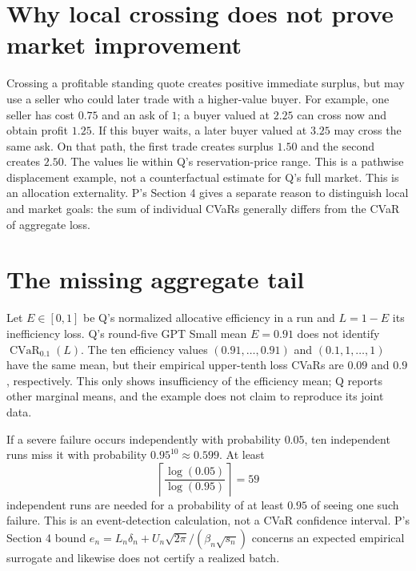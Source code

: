 \documentclass{article}
\begin{document}
\section*{Why local crossing does not prove market improvement}
Crossing a profitable standing quote creates positive immediate surplus, but
may use a seller who could later trade with a higher-value buyer. For example,
one seller has cost \(0.75\) and an ask of \(1\); a buyer valued at \(2.25\)
can cross now and obtain profit \(1.25\). If this buyer waits, a later buyer
valued at \(3.25\) may cross the same ask. On that path, the first trade creates
surplus \(1.50\) and the second creates \(2.50\). The values lie within Q's
reservation-price range. This is a pathwise displacement example, not a
counterfactual estimate for Q's full market. This is an allocation externality.
P's Section 4 gives a separate reason to distinguish local and market goals:
the sum of individual CVaRs generally differs from the CVaR of aggregate loss.

\section*{The missing aggregate tail}
Let \(E\in[0,1]\) be Q's normalized allocative efficiency in a run and
\(L=1-E\) its inefficiency loss. Q's round-five GPT Small mean \(E=0.91\)
does not identify \(\operatorname{CVaR}_{0.1}(L)\). The ten efficiency values
\((0.91,\ldots,0.91)\) and \((0.1,1,\ldots,1)\) have the same mean, but their
empirical upper-tenth loss CVaRs are \(0.09\) and \(0.9\), respectively. This
only shows insufficiency of the efficiency mean; Q reports other marginal
means, and the example does not claim to reproduce its joint data.

If a severe failure occurs independently with probability \(0.05\), ten
independent runs miss it with probability \(0.95^{10}\approx0.599\). At least
\[
\left\lceil\frac{\log(0.05)}{\log(0.95)}\right\rceil=59
\]
independent runs are needed
for a probability of at least \(0.95\) of seeing one such failure. This is an
event-detection calculation, not a CVaR confidence interval. P's Section 4
bound \(e_n=L_n\delta_n+U_n\sqrt{2\pi}/(\beta_n\sqrt{s_n})\) concerns an
expected empirical surrogate and likewise does not certify a realized batch.
\end{document}
